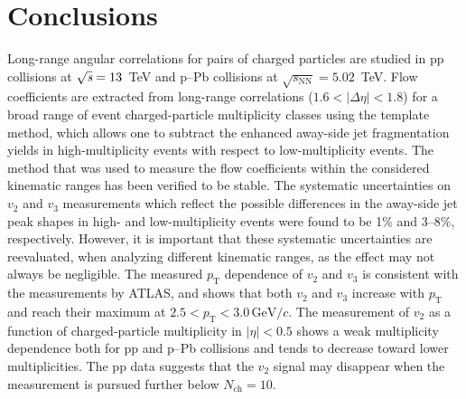 
\section{Conclusions}
\label{sec:summary}
Long-range angular correlations for pairs of charged particles are studied in pp collisions at ${\sqrt{{\textit s}}}=13$~TeV and p--Pb collisions at $\sqrt{s_\mathrm{NN}} = 5.02$~TeV. Flow coefficients are extracted from long-range correlations ($1.6 <|\Delta\eta| < 1.8$) for a broad range of event charged-particle multiplicity classes using the template method, which allows one to subtract the enhanced away-side jet fragmentation yields in high-multiplicity events with respect to low-multiplicity events. The method that was used to measure the flow coefficients within the considered kinematic ranges has been verified to be stable.
The systematic uncertainties on $v_2$ and $v_3$ measurements which reflect the possible differences in the away-side jet peak shapes in high- and low-multiplicity events were found to be 1\% and 3–8\%, respectively.
However, it is important that these systematic uncertainties are reevaluated, when analyzing different kinematic ranges, as the effect may not always be negligible.
The measured $p_\mathrm{T}$ dependence of $v_2$ and $v_3$ is consistent with the measurements by ATLAS, and shows that both $v_2$ and $v_3$ increase with $p_\mathrm{T}$ and reach their maximum at $2.5<p_\mathrm{T}<3.0\,\mathrm{GeV}/c$.
The measurement of $v_2$ as a function of charged-particle multiplicity in $|\eta|<0.5$ shows a weak multiplicity dependence both for pp and p--Pb collisions and tends to decrease toward lower multiplicities.
The pp data suggests that the $v_2$ signal may disappear when the measurement is pursued further below $N_{\mathrm{ch}} = 10$. 

